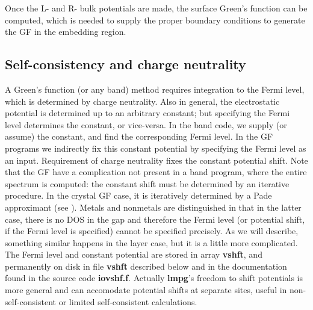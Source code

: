 \documentclass{article}
\begin{document}
Once the L- and R- bulk potentials are made, the surface Green's
function can be computed, which is needed to supply the proper
boundary conditions to generate the GF in the embedding region.

\subsection{Self-consistency and charge neutrality}
\label{sec:neutrality}

A Green's function (or any band) method requires integration to
the Fermi level, which is determined by charge neutrality.  Also
in general, the electrostatic potential is determined up to an
arbitrary constant; but specifying the Fermi level determines the
constant, or vice-versa.  In
the band code, we supply (or assume) the constant, and find the
corresponding Fermi level.  In the GF programs we indirectly fix
this constant potential by specifying the Fermi level as an
input.  Requirement of charge neutrality fixes the constant
potential shift.  Note that the GF have a complication not
present in a band program, where the entire spectrum is computed:
the constant shift must be determined by an iterative procedure.
In the crystal GF case, it is iteratively determined by a Pade
approximant (see ).
Metals and nonmetals are distinguished in that in the latter
case, there is no DOS in the gap and therefore the Fermi level
(or potential shift, if the Fermi level is specified) cannot be
specified precisely.  As we will describe, something similar
happens in the layer case, but it is a little more complicated.
The Fermi level and constant potential are stored in array {\bf
vshft}, and permanently on disk in file {\bf vshft} described
below and in the documentation found in the source code {\bf
iovshf.f}.  Actually {\bf lmpg}'s freedom to shift potentials is
more general and can accomodate potential shifts at separate
sites, useful in non-self-consistent or limited self-consistent
calculations.
\end{document}
